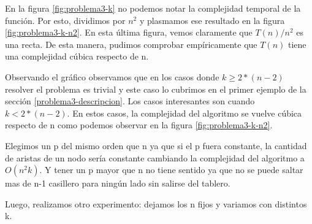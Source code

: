 En la figura \ref{fig:problema3-k} no podemos notar la complejidad temporal de la función. Por esto, dividimos por $n^2$ y plasmamos ese resultado en la figura \ref{fig:problema3-k-n2}. En esta última figura, vemos claramente que $T(n) / n ^ 2$ es una recta. De esta manera, pudimos comprobar empíricamente que $T(n)$ tiene una complejidad cúbica respecto de n.

Observando el gráfico observamos que en los casos donde $k \geq 2*(n-2)$ resolver el problema es trivial y este caso lo cubrimos en el primer ejemplo de la sección \ref{problema3-descripcion}. Los casos interesantes son cuando $k < 2*(n-2)$. En estos casos, la complejidad del algoritmo se vuelve cúbica respecto de n como podemos observar en la figura \ref{fig:problema3-k-n2}.

Elegimos un p del mismo orden que n ya que si el p fuera constante, la cantidad de aristas de un nodo sería constante cambiando la complejidad del algoritmo a $O(n^2k)$. Y tener un p mayor que n no tiene sentido ya que no se puede saltar mas de n-1 casillero para ningún lado sin salirse del tablero.

Luego, realizamos otro experimento: dejamos los n fijos y variamos con distintos k.

